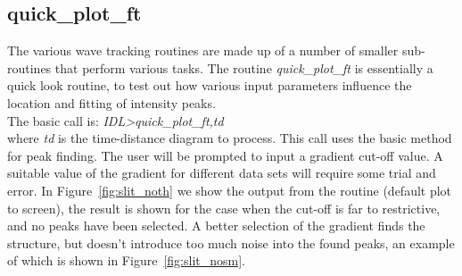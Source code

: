 \documentclass{article}
\begin{document}
\smallskip

\subsection{{quick\_plot\_ft} }
The various wave tracking routines are made up of a number of smaller sub-routines that perform various tasks. The routine \textit{quick\_plot\_ft} is essentially a quick look routine, to test out how various input parameters influence the location and fitting of intensity peaks.\\


The basic call is: \textit{IDL\textgreater quick\_plot\_ft,td} \\

where \textit{td} is the time-distance diagram to process. This call uses the basic method for peak finding. The user will be prompted to input a gradient cut-off value. A suitable value of the gradient for different data sets will require some trial and error. In Figure~\ref{fig:slit_noth} we show the output from the routine (default plot to screen), the result is shown for the case when the cut-off is far to restrictive, and no peaks have been selected. A better selection of the gradient finds the structure, but doesn't introduce too much noise into the found peaks, an example of which is shown in Figure~\ref{fig:slit_nosm}. \\
\end{document}
